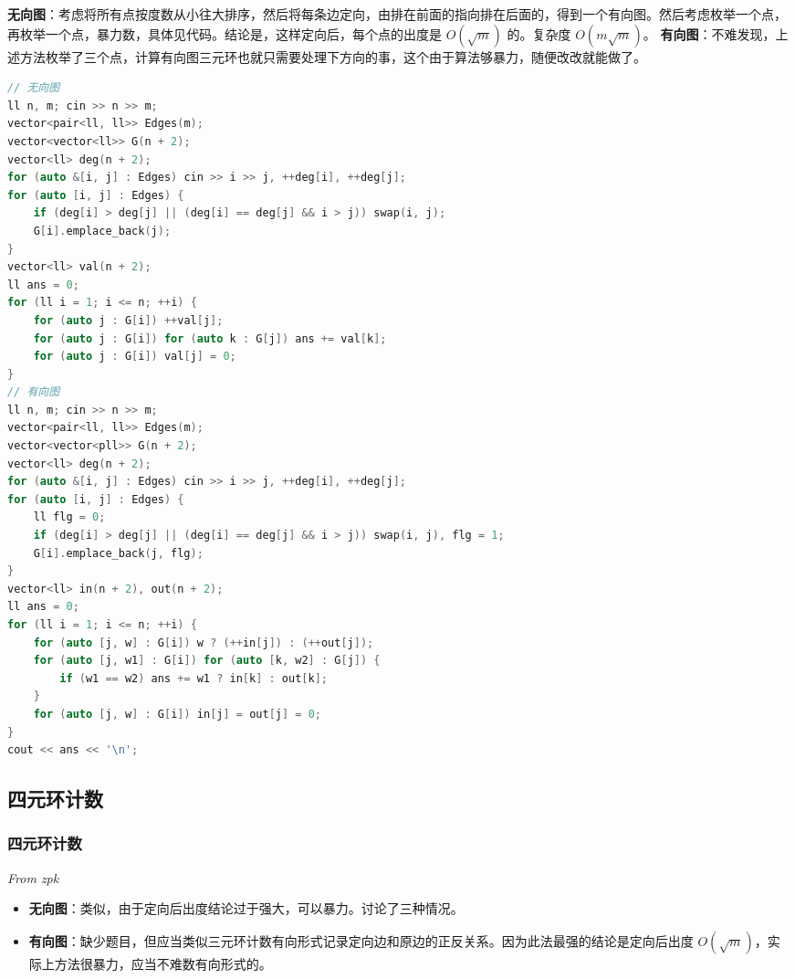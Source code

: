 \documentclass[10pt]{ctexart}
\providecommand{\tightlist}{\setlength{\itemsep}{0pt}\setlength{\parskip}{0pt}}
\begin{document}
\begin{multicols}{3}
    \textbf{无向图}：考虑将所有点按度数从小往大排序，然后将每条边定向，由排在前面的指向排在后面的，得到一个有向图。然后考虑枚举一个点，再枚举一个点，暴力数，具体见代码。结论是，这样定向后，每个点的出度是
    \(O(\sqrt{m})\) 的。复杂度 \(O(m\sqrt{m})\)。
    \textbf{有向图}：不难发现，上述方法枚举了三个点，计算有向图三元环也就只需要处理下方向的事，这个由于算法够暴力，随便改改就能做了。

\begin{lstlisting}[language={C++}]
// 无向图
ll n, m; cin >> n >> m;
vector<pair<ll, ll>> Edges(m);
vector<vector<ll>> G(n + 2);
vector<ll> deg(n + 2);
for (auto &[i, j] : Edges) cin >> i >> j, ++deg[i], ++deg[j];
for (auto [i, j] : Edges) {
    if (deg[i] > deg[j] || (deg[i] == deg[j] && i > j)) swap(i, j);
    G[i].emplace_back(j);
}
vector<ll> val(n + 2);
ll ans = 0;
for (ll i = 1; i <= n; ++i) {
    for (auto j : G[i]) ++val[j];
    for (auto j : G[i]) for (auto k : G[j]) ans += val[k];
    for (auto j : G[i]) val[j] = 0;
}
// 有向图
ll n, m; cin >> n >> m;
vector<pair<ll, ll>> Edges(m);
vector<vector<pll>> G(n + 2);
vector<ll> deg(n + 2);
for (auto &[i, j] : Edges) cin >> i >> j, ++deg[i], ++deg[j];
for (auto [i, j] : Edges) {
    ll flg = 0;
    if (deg[i] > deg[j] || (deg[i] == deg[j] && i > j)) swap(i, j), flg = 1;
    G[i].emplace_back(j, flg);
}
vector<ll> in(n + 2), out(n + 2);
ll ans = 0;
for (ll i = 1; i <= n; ++i) {
    for (auto [j, w] : G[i]) w ? (++in[j]) : (++out[j]);
    for (auto [j, w1] : G[i]) for (auto [k, w2] : G[j]) {
        if (w1 == w2) ans += w1 ? in[k] : out[k];
    }
    for (auto [j, w] : G[i]) in[j] = out[j] = 0;
}
cout << ans << '\n';
\end{lstlisting}

    \subsection{四元环计数}\label{ux56dbux5143ux73afux8ba1ux6570}

    \subsubsection{四元环计数}\label{ux56dbux5143ux73afux8ba1ux6570-1}

    \emph{From zpk}

    \begin{itemize}
    \tightlist
    \item
      \textbf{无向图}：类似，由于定向后出度结论过于强大，可以暴力。讨论了三种情况。
    \item
      \textbf{有向图}：缺少题目，但应当类似三元环计数有向形式记录定向边和原边的正反关系。因为此法最强的结论是定向后出度
      \(O(\sqrt{m})\)，实际上方法很暴力，应当不难数有向形式的。
    \end{itemize}


\end{multicols}
\end{document}
